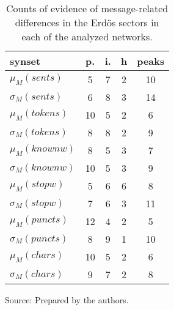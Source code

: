 \begin{table}[h!]
\begin{center}
\caption{Counts of evidence of message-related differences in the Erd\"os sectors in each of the analyzed networks.}
\begin{tabular}{| l || c | c | c || c |}\hline
{\bf synset} & {\bf p.} & {\bf i.} & {\bf h} & {\bf peaks} \\\hline\hline
$\mu_M(sents)$ & 5  & 7  & 2  & 10 \\
$\sigma_M(sents)$ & 6  & 8  & 3  & 14 \\\hline
$\mu_M(tokens)$ & 10  & 5  & 2  & 6 \\
$\sigma_M(tokens)$ & 8  & 8  & 2  & 9 \\\hline
$\mu_M(knownw)$ & 8  & 5  & 3  & 7 \\
$\sigma_M(knownw)$ & 10  & 5  & 3  & 9 \\\hline
$\mu_M(stopw)$ & 5  & 6  & 6  & 8 \\
$\sigma_M(stopw)$ & 7  & 6  & 3  & 11 \\\hline
$\mu_M(puncts)$ & 12  & 4  & 2  & 5 \\
$\sigma_M(puncts)$ & 8  & 9  & 1  & 10 \\\hline
$\mu_M(chars)$ & 10  & 5  & 2  & 6 \\
$\sigma_M(chars)$ & 9  & 7  & 2  & 8 \\\hline
\end{tabular}
\begin{flushleft}
		Source: Prepared by the authors.\
\end{flushleft}
\end{center}
\end{table}
